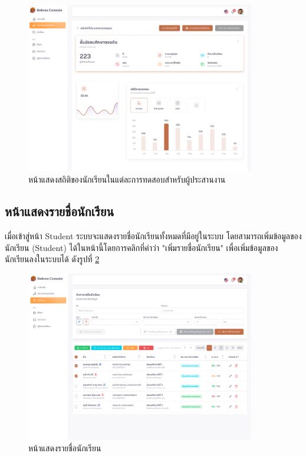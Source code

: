 \begin{figure}[H]
    \centering
    \includegraphics[width=100mm,scale=1.0]{images/statistic.png}
    \caption{หน้าแสดงสถิติของนักเรียนในแต่ละการทดสอบสำหรับผู้ประสานงาน}
    \label{fig:teacher-contest-stats}
\end{figure}

\subsection{หน้าแสดงรายชื่อนักเรียน}

เมื่อเข้าสู่หน้า Student ระบบจะแสดงรายชื่อนักเรียนทั้งหมดที่มีอยู่ในระบบ โดยสามารถเพิ่มข้อมูลของนักเรียน (Student) ได้ในหน้านี้โดยการคลิกที่คำว่า "เพิ่มรายชื่อนักเรียน" เพื่อเพิ่มข้อมูลของนักเรียนลงในระบบได้ ดังรูปที่ \ref{fig:dashboard-student}

\begin{figure}[H]
    \centering
    \includegraphics[width=100mm,scale=1.0]{images/students.png}
    \caption{หน้าแสดงรายชื่อนักเรียน}
    \label{fig:dashboard-student}
\end{figure}

